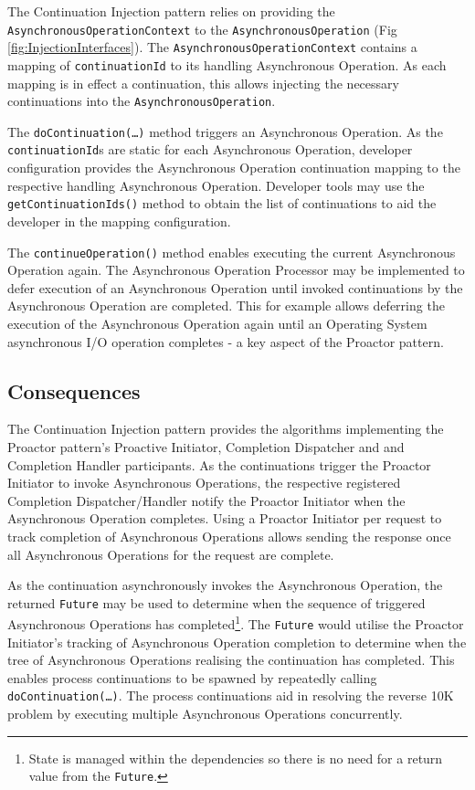 \documentclass[prodmode]{style/acmlarge}
\begin{document}
The Continuation Injection pattern relies on providing the
\texttt{AsynchronousOperationContext} to the \texttt{AsynchronousOperation} (Fig
\ref{fig:InjectionInterfaces}).  The \texttt{AsynchronousOperationContext}
contains a mapping of \texttt{continuationId} to its handling Asynchronous
Operation.  As each mapping is in effect a continuation, this allows injecting
the necessary continuations into the \texttt{AsynchronousOperation}.

The \texttt{doContinuation(\ldots)} method triggers an Asynchronous Operation.
As the \texttt{continuationId}s are static for each Asynchronous Operation,
developer configuration provides the Asynchronous Operation continuation mapping
to the respective handling Asynchronous Operation.  Developer tools may use the
\texttt{getContinuationIds()} method to obtain the list of continuations to aid
the developer in the mapping configuration.

The \texttt{continueOperation()} method enables executing the current
Asynchronous Operation again.  The Asynchronous Operation Processor may be
implemented to defer execution of an Asynchronous Operation until invoked
continuations by the Asynchronous Operation are completed.  This for example
allows deferring the execution of the Asynchronous Operation again until an
Operating System asynchronous I/O operation completes - a key aspect of the
Proactor pattern.


\subsection{Consequences}

The Continuation Injection pattern provides the algorithms implementing the
Proactor pattern's Proactive Initiator, Completion Dispatcher and and Completion
Handler participants.  As the continuations trigger the Proactor Initiator to
invoke Asynchronous Operations, the respective registered Completion
Dispatcher/Handler notify the Proactor Initiator when the Asynchronous Operation
completes.  Using a Proactor Initiator per request to track completion of
Asynchronous Operations allows sending the response once all Asynchronous
Operations for the request are complete.

As the continuation asynchronously invokes the Asynchronous Operation, the
returned \texttt{Future} may be used to determine when the sequence of triggered
Asynchronous Operations has completed\footnote{State is managed within the
dependencies so there is no need for a return value from the \texttt{Future}.}.
The \texttt{Future} would utilise the Proactor Initiator's tracking of
Asynchronous Operation completion to determine when the tree of Asynchronous
Operations realising the continuation has completed.  This enables process
continuations \cite{process-continuation} to be spawned by repeatedly calling
\texttt{doContinuation(\ldots)}.  The process continuations aid in resolving the
reverse 10K problem \cite{reverse-ten-k-problem} by executing multiple
Asynchronous Operations concurrently.
\end{document}
